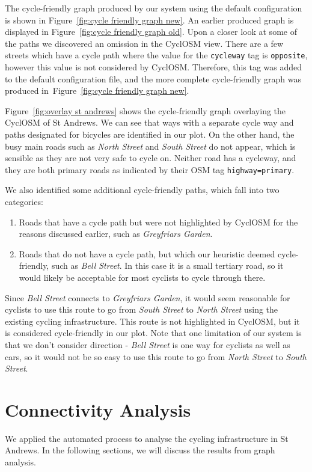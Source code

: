 \documentclass[12pt,a4paper]{report}
\begin{document}
The cycle-friendly graph produced by our system using the default configuration is shown in Figure~\ref{fig:cycle friendly graph new}. An earlier produced graph is displayed in Figure~\ref{fig:cycle friendly graph old}. Upon a closer look at some of the paths we discovered an omission in the CyclOSM view. There are a few streets which have a cycle path where the value for the \texttt{cycleway} tag is \texttt{opposite}, however this value is not considered by CyclOSM. Therefore, this tag was added to the default configuration file, and the more complete cycle-friendly graph was produced in~Figure~\ref{fig:cycle friendly graph new}.

Figure~\ref{fig:overlay st andrews} shows the cycle-friendly graph overlaying the CyclOSM of St Andrews. We can see that ways with a separate cycle way and paths designated for bicycles are identified in our plot. On the other hand, the busy main roads such as \textit{North Street} and \textit{South Street} do not appear, which is sensible as they are not very safe to cycle on. Neither road has a cycleway, and they are both primary roads as indicated by their OSM tag \texttt{highway=primary}.

We also identified some additional cycle-friendly paths, which fall into two categories: \begin{enumerate}
    \item Roads that have a cycle path but were not highlighted by CyclOSM for the reasons discussed earlier, such as \textit{Greyfriars Garden}.
    \item Roads that do not have a cycle path, but which our heuristic deemed cycle-friendly, such as \textit{Bell Street}. In this case it is a small tertiary road, so it would likely be acceptable for most cyclists to cycle through there.
\end{enumerate}

Since \textit{Bell Street} connects to \textit{Greyfriars Garden}, it would seem reasonable for cyclists to use this route to go from \textit{South Street} to \textit{North Street} using the existing cycling infrastructure. This route is not highlighted in CyclOSM, but it is considered cycle-friendly in our plot. Note that one limitation of our system is that we don't consider direction - \textit{Bell Street} is one way for cyclists as well as cars, so it would not be so easy to use this route to go from \textit{North Street} to \textit{South Street}.

\section{Connectivity Analysis}\label{sec:connectivity}
We applied the automated process to analyse the cycling infrastructure in St Andrews. In the following sections, we will discuss the results from graph analysis.
\end{document}
